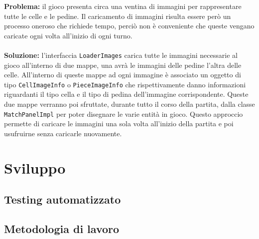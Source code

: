 \documentclass[a4paper,12pt]{report}
\begin{document}
\textbf{Problema:} il gioco presenta circa una ventina di immagini per rappresentare tutte le celle e le pedine. Il caricamento di immagini risulta essere però un processo oneroso che richiede tempo, perciò non è conveniente che queste vengano caricate ogni volta all'inizio di ogni turno. 
\\\\
\textbf{Soluzione:}  l'interfaccia \texttt{LoaderImages} carica tutte le immagini necessarie al gioco all’interno di due mappe, una avrà le immagini delle pedine l’altra delle celle. All’interno di queste mappe ad ogni immagine è associato un oggetto di tipo \texttt{CellImageInfo} o \texttt{PieceImageInfo} che rispettivamente danno informazioni riguardanti il tipo cella e il tipo di pedina dell’immagine corrispondente.
Queste due mappe verranno poi sfruttate, durante tutto il corso della partita, dalla classe \texttt{MatchPanelImpl} per poter disegnare le varie entità in gioco. Questo approccio permette di caricare le immagini una sola volta all'inizio della partita e poi usufruirne  senza caricarle nuovamente. 



\chapter{Sviluppo}


\section{Testing automatizzato}


\section{Metodologia di lavoro}
\end{document}
